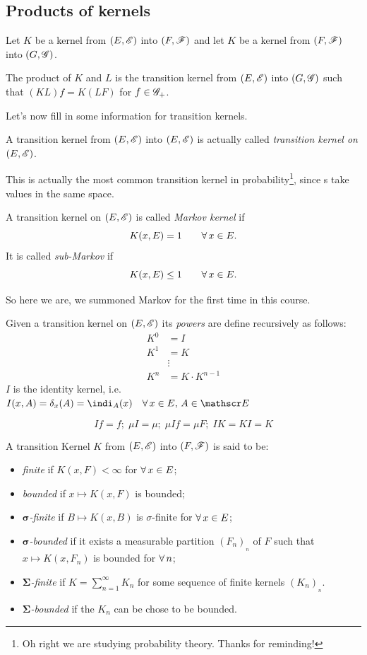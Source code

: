 \documentclass{report}
\begin{document}
\subsection{Products of kernels}
Let $K$ be a kernel from $(E,\mathscr{E})$ into $(F,\mathscr{F})$ and let $K$ be a kernel from $(F,\mathscr{F})$ into $(G,\mathscr{G})$.
\begin{definition}
	The product of $K$ and $L$ is the transition kernel from $(E,\mathscr{E})$ into $(G,\mathscr{G})$ such that $(KL)f=K(LF)$ for $f\in\mathscr{G}_+$.
\end{definition}
Let's now fill in some information for transition kernels.
\begin{definition}
	A transition kernel from $(E,\mathscr{E})$ into $(E,\mathscr{E})$ is actually called \emph{transition kernel on $(E,\mathscr{E})$}.
\end{definition}
This is actually the most common transition kernel in probability\footnote{Oh right we are studying probability theory. Thanks for reminding!}, since \rv s take values in the same space.
\begin{definition}
	A transition kernel on $(E,\mathscr{E})$ is called \emph{Markov kernel} if 
	\[K(x,E)=1\qquad\forall\, x\in E.\]
	It is called \emph{sub-Markov} if
	\[K(x,E)\leq1\qquad\forall\, x\in E.\]
\end{definition}
So here we are, we summoned Markov for the first time in this course.
\begin{definition}
	Given a transition kernel on $(E,\mathscr{E})$ its \emph{powers} are define recursively as follows:
	\begin{align*}
		K^0&=I\\
		K^1&=K\\
		&\vdots\\
		K^n&=K\cdot K^{n-1}
	\end{align*}
	$I$ is the identity kernel, i.e. $I(x,A)=\delta_x(A)=\indi_A(x)\quad\every x\in E,\, A\in\E$
\end{definition}
\begin{remark}
	\[If=f;\;\mu I=\mu;\;\mu If=\mu F;\; IK=KI=K\]
\end{remark}
\begin{definition}
	A transition Kernel $K$ from $(E,\mathscr{E})$ into $(F,\mathscr{F})$ is said to be:
	\begin{itemize}
		\item \emph{finite} if $K(x,F)<\infty$ for $\forall\, x\in E$;
		\item \emph{bounded} if $x\mapsto K(x,F)$ is bounded;
		\item \emph{$\mathbf{\sigma}$-finite} if $B\mapsto K(x,B)$ is $\sigma$-finite for $\forall\, x\in E$;
		\item \emph{$\mathbf{\sigma}$-bounded} if it exists a measurable partition $(F_n)_{_{n}}$ of $F$ such that $x\mapsto K(x,F_n)$ is bounded for $\forall\, n$;
		\item \emph{$\mathbf{\Sigma}$-finite} if $K=\sum_{n=1}^{\infty}K_n$ for some sequence of finite kernels $(K_n)_{_{n}}$.
		\item \emph{$\mathbf{\Sigma}$-bounded} if the $K_{n}$ can be chose to be bounded.
	\end{itemize}
\end{definition}
\end{document}
